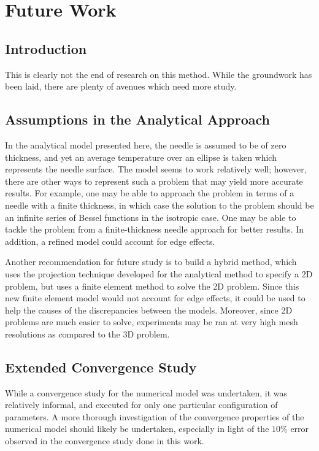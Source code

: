 \chapter{Future Work}

\section{Introduction}

This is clearly not the end of research on this method. While the groundwork has
been laid, there are plenty of avenues which need more study.

\section{Assumptions in the Analytical Approach}

In the analytical model presented here, the needle is assumed to be of zero
thickness, and yet an average temperature over an ellipse is taken which
represents the needle surface.  The model seems to work relatively well; however, there are
other ways to represent such a problem that may yield more accurate results. For
example, one may be able to approach the problem in terms of a needle with a
finite thickness, in which case the solution to the problem should be an
infinite series of Bessel functions in the isotropic case. One may be able to
tackle the problem from a finite-thickness needle approach for better results. In addition, a refined model could account for edge effects. \cite{axialerror}

Another recommendation for future study is to build a hybrid method, which uses
the projection technique developed for the analytical method to specify a 2D
problem, but uses a finite element method to solve the 2D problem. Since this
new finite element model would not account for edge effects, it could be used to
help the causes of the discrepancies between the models. Moreover, since 2D
problems are much easier to solve, experiments may be ran at very high mesh
resolutions as compared to the 3D problem.

\section{Extended Convergence Study}

While a convergence study for the numerical model was undertaken, it was relatively
informal, and executed for only one particular configuration of parameters. A
more thorough investigation of the convergence properties of the numerical model
should likely be undertaken, especially in light of the \(10\%\) error observed
in the convergence study done in this work.

